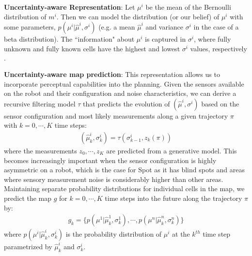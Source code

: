 \documentclass[letterpaper, 10pt, conference]{ieeeconf}      %
\newcommand{\ph}[1]{{\textbf{#1}:}} %
\newcommand{\rev}[1]{{\color{blue} #1 }} %
\begin{document}

\ph{Uncertainty-aware Representation}
\rev{Let $\mu^i$ be the mean of the Bernoulli distribution of $m^i$.  Then we can model the distribution (or our belief) of $\mu^i$ with some parameters, $p(\mu^i|\hat{\mu}^i,\sigma^{i})$ (e.g. a mean $\hat{\mu}^i$ and variance $\sigma^i$ in the case of a beta distribution).}The ``information" about $\mu^i$ is captured in $\sigma^i$, where fully unknown and fully known cells have the highest and lowest $\sigma^i$ values, respectively \rev{\cite{CRM}}. 

\ph{Uncertainty-aware map prediction}
This representation allows us to incorporate perceptual capabilities %
into the planning. Given the sensors available on the robot and their configuration and noise characteristics, \rev{we can derive a recursive filtering model $\tau$ that predicts the evolution of $(\hat{\mu}^i,\sigma^i)$}based on the sensor configuration and most likely measurements along a given trajectory $\pi$ with \rev{$k=0,\cdots,K$ time steps:} 
\rev{\begin{align}
 (\hat{\mu}^i_k, \sigma^i_k) =\tau( \sigma^i_{k-1}, z_{k}(\pi) )
\end{align}}
\rev{where the measurements $z_0,\cdots,z_K$ are predicted from a generative model.}This becomes increasingly important when the sensor configuration is highly asymmetric on a robot, which is the case for Spot as it has blind spots and areas where sensory measurement noise is considerably higher than other areas.
Maintaining separate probability distributions for individual cells in the map, we predict the map $g$ for $k=0,\cdots,K$ time steps into the future along the trajectory $\pi$ by: 
\begin{align}
 g_k = \{p(\mu^1|\hat{\mu}^1_k,\sigma^1_k),\cdots,p(\mu^n|\hat{\mu}^n_k,\sigma^n_k)\}   
\end{align}
where $p(\mu^i|\hat{\mu}^i_k,\sigma^i_k)$ is the probability distribution of $\mu^i$ at the $k^{th}$ time step parametrized by $\hat{\mu}^i_k$ and $\sigma^i_k$.
\end{document}
